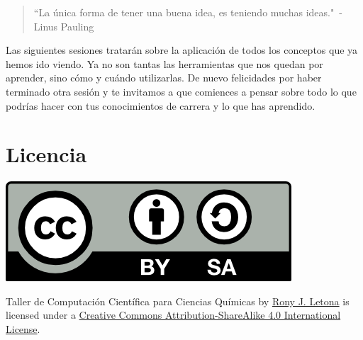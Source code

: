 \documentclass[10pt,letterpaper]{article}
\begin{document}
\begin{quote}
``La \'unica forma de tener una buena idea, es teniendo muchas ideas."\ - Linus Pauling
\end{quote}

Las siguientes sesiones tratar\'an sobre la aplicaci\'on de todos los conceptos que ya hemos ido viendo. Ya no son tantas las herramientas que nos quedan por aprender, sino c\'omo y cu\'ando utilizarlas. De nuevo felicidades por haber terminado otra sesi\'on y te invitamos a que comiences a pensar sobre todo lo que podr\'ias hacer con tus conocimientos de carrera y lo que has aprendido.

\section*{Licencia}

\noindent \includegraphics{img/cc_big.png}

\noindent Taller de Computaci\'on Cient\'ifica para Ciencias Qu\'imicas by \href{http://github.com/zronyj/TC3Q}{Rony J. Letona} is licensed under a \href{http://creativecommons.org/licenses/by-sa/4.0/}{Creative Commons Attribution-ShareAlike 4.0 International License}.
\end{document}
